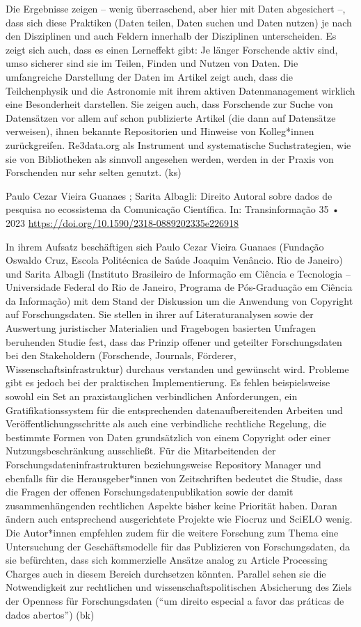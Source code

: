 \documentclass[a4paper,
fontsize=11pt,
oneside,
numbers=noperiodatend,
parskip=half-,
bibliography=totoc,
final
]{scrartcl}
\begin{document}
Die Ergebnisse zeigen -- wenig überraschend, aber hier mit Daten
abgesichert --, dass sich diese Praktiken (Daten teilen, Daten suchen
und Daten nutzen) je nach den Disziplinen und auch Feldern innerhalb der
Disziplinen unterscheiden. Es zeigt sich auch, dass es einen Lerneffekt
gibt: Je länger Forschende aktiv sind, umso sicherer sind sie im Teilen,
Finden und Nutzen von Daten. Die umfangreiche Darstellung der Daten im
Artikel zeigt auch, dass die Teilchenphysik und die Astronomie mit ihrem
aktiven Datenmanagement wirklich eine Besonderheit darstellen. Sie
zeigen auch, dass Forschende zur Suche von Datensätzen vor allem auf
schon publizierte Artikel (die dann auf Datensätze verweisen), ihnen
bekannte Repositorien und Hinweise von Kolleg*innen zurückgreifen.
Re3data.org als Instrument und systematische Suchstrategien, wie sie von
Bibliotheken als sinnvoll angesehen werden, werden in der Praxis von
Forschenden nur sehr selten genutzt. (ks)

Paulo Cezar Vieira Guanaes ; Sarita Albagli: Direito Autoral sobre dados
de pesquisa no ecossistema da Comunicação Científica. In:
Transinformação 35 • 2023
\url{https://doi.org/10.1590/2318-0889202335e226918}

In ihrem Aufsatz beschäftigen sich Paulo Cezar Vieira Guanaes (Fundação
Oswaldo Cruz, Escola Politécnica de Saúde Joaquim Venâncio. Rio de
Janeiro) und Sarita Albagli (Instituto Brasileiro de Informação em
Ciência e Tecnologia -- Universidade Federal do Rio de Janeiro, Programa
de Pós-Graduação em Ciência da Informação) mit dem Stand der Diskussion
um die Anwendung von Copyright auf Forschungsdaten. Sie stellen in ihrer
auf Literaturanalysen sowie der Auswertung juristischer Materialien und
Fragebogen basierten Umfragen beruhenden Studie fest, dass das Prinzip
offener und geteilter Forschungsdaten bei den Stakeholdern (Forschende,
Journals, Förderer, Wissenschaftsinfrastruktur) durchaus verstanden und
gewünscht wird. Probleme gibt es jedoch bei der praktischen
Implementierung. Es fehlen beispielsweise sowohl ein Set an
praxistauglichen verbindlichen Anforderungen, ein Gratifikationssystem
für die entsprechenden datenaufbereitenden Arbeiten und
Veröffentlichungsschritte als auch eine verbindliche rechtliche
Regelung, die bestimmte Formen von Daten grundsätzlich von einem
Copyright oder einer Nutzungsbeschränkung ausschließt. Für die
Mitarbeitenden der Forschungsdateninfrastrukturen beziehungsweise
Repository Manager und ebenfalls für die Herausgeber*innen von
Zeitschriften bedeutet die Studie, dass die Fragen der offenen
Forschungsdatenpublikation sowie der damit zusammenhängenden rechtlichen
Aspekte bisher keine Priorität haben. Daran ändern auch entsprechend
ausgerichtete Projekte wie Fiocruz und SciELO wenig. Die Autor*innen
empfehlen zudem für die weitere Forschung zum Thema eine Untersuchung
der Geschäftsmodelle für das Publizieren von Forschungsdaten, da sie
befürchten, dass sich kommerzielle Ansätze analog zu Article Processing
Charges auch in diesem Bereich durchsetzen könnten. Parallel sehen sie
die Notwendigkeit zur rechtlichen und wissenschaftspolitischen
Absicherung des Ziels der Openness für Forschungsdaten (\enquote{um
direito especial a favor das práticas de dados abertos}) (bk)
\end{document}

